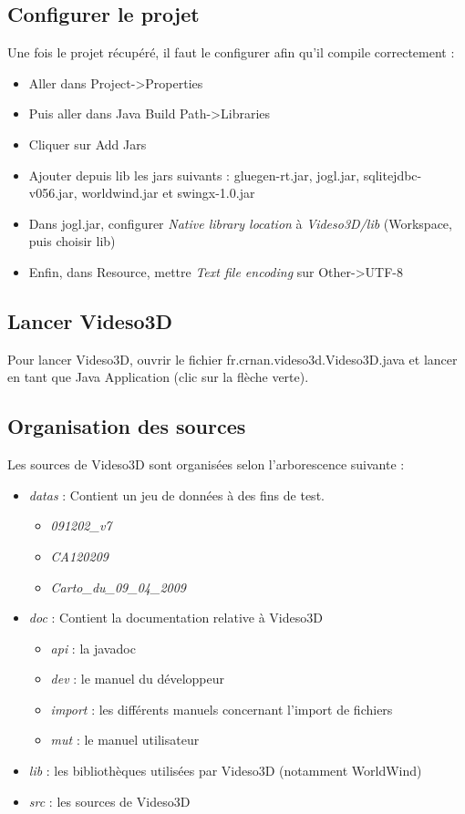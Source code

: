 \documentclass[a4paper, titlepage]{article}
\begin{document}
\subsection{Configurer le projet}
Une fois le projet récupéré, il faut le configurer afin qu'il compile
correctement :
\begin{itemize}
  \item Aller dans Project->Properties
  \item Puis aller dans Java Build Path->Libraries
  \item Cliquer sur Add Jars
  \item Ajouter depuis lib les jars suivants : gluegen-rt.jar, jogl.jar,
  sqlitejdbc-v056.jar, worldwind.jar et swingx-1.0.jar
  \item Dans jogl.jar, configurer \emph{Native library location} à
  \emph{Videso3D/lib} (Workspace, puis choisir lib)
  \item Enfin, dans Resource, mettre \emph{Text file encoding} sur Other->UTF-8
\end{itemize}

\subsection{Lancer Videso3D}
Pour lancer Videso3D, ouvrir le fichier fr.crnan.videso3d.Videso3D.java et
lancer en tant que Java Application (clic sur la flèche verte).

\subsection{Organisation des sources}
Les sources de Videso3D sont organisées selon l'arborescence suivante :
\begin{itemize}
  \item \emph{datas} : Contient un jeu de données à des fins de test. 
 		\begin{itemize}
           \item \emph{091202\_v7}
           \item \emph{CA120209}
           \item \emph{Carto\_du\_09\_04\_2009}
        \end{itemize}
  \item \emph{doc} : Contient la documentation relative à Videso3D
  		\begin{itemize}
           \item \emph{api} : la javadoc
           \item \emph{dev} : le manuel du développeur
           \item \emph{import} : les différents manuels concernant l'import de
           fichiers
           \item \emph{mut} : le manuel utilisateur
        \end{itemize} 
  \item \emph{lib} : les bibliothèques utilisées par Videso3D (notamment
  WorldWind)
  \item \emph{src} : les sources de Videso3D
\end{itemize}
\end{document}
